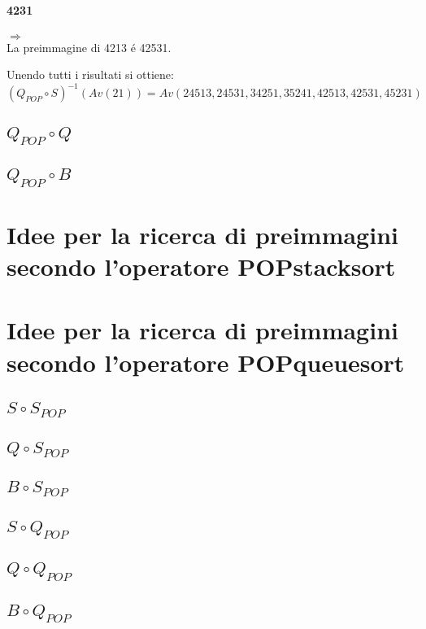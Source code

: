 \paragraph*{4231}\begin{center}$\Rightarrow$\\La preimmagine di 4213 \'e 42531.\end{center}
Unendo tutti i risultati si ottiene:$$(Q_{POP}\circ{S})^{-1}(Av(21)) = Av(24513, 24531, 34251, 35241, 42513, 42531, 45231)$$
\subsection*{$Q_{POP}\circ{Q}$}
\subsection*{$Q_{POP}\circ{B}$}
\section*{Idee per la ricerca di preimmagini secondo l'operatore POPstacksort}
\section*{Idee per la ricerca di preimmagini secondo l'operatore POPqueuesort}
\subsection*{$S\circ{S_{POP}}$}
\subsection*{$Q\circ{S_{POP}}$}
\subsection*{$B\circ{S_{POP}}$}
\subsection*{$S\circ{Q_{POP}}$}
\subsection*{$Q\circ{Q_{POP}}$}
\subsection*{$B\circ{Q_{POP}}$}
